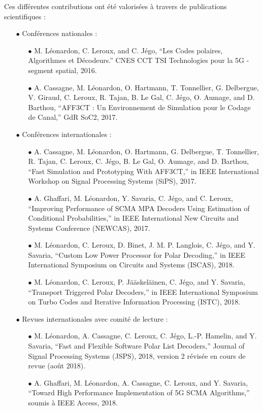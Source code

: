 \vspace{1cm}
Ces différentes contributions ont été valorisées à travers de publications scientifiques : \\

\begin{itemize}
		\item[$\bullet$] Conférences nationales :
	\begin{itemize}
		\item[$\bullet$] M. Léonardon, C. Leroux, and C. Jégo, “Les Codes polaires, Algorithmes et Décodeurs.”
		CNES CCT TSI Technologies pour la 5G - segment spatial, 2016.
     	\item[$\bullet$] A. Cassagne, M. Léonardon, O. Hartmann, T. Tonnellier, G. Delbergue, V. Giraud, C. Leroux, R. Tajan, B. Le Gal, C. Jégo, O. Aumage, and D. Barthou, “AFF3CT : Un Environnement de Simulation pour le Codage de Canal,” GdR SoC2, 2017.
	\end{itemize}
	\item[$\bullet$] Conférences internationales :
	\begin{itemize}
		\item[$\bullet$]  A. Cassagne, M. Léonardon, O. Hartmann, G. Delbergue, T. Tonnellier, R. Tajan, C. Leroux, C. Jégo, B. Le Gal, O. Aumage, and D. Barthou, “Fast Simulation and Prototyping With AFF3CT,” in IEEE International Workshop on Signal Processing Systems (SiPS), 2017.
		\item[$\bullet$] A. Ghaffari, M. Léonardon, Y. Savaria, C. Jégo, and C. Leroux, “Improving Performance of SCMA MPA Decoders Using Estimation of Conditional Probabilities,” in IEEE International New Circuits and Systems Conference (NEWCAS), 2017.
		\item[$\bullet$] M. Léonardon, C. Leroux, D. Binet, J. M. P. Langlois, C. Jégo, and Y. Savaria, “Custom Low Power Processor for Polar Decoding,” in IEEE International Symposium on Circuits and Systems (ISCAS), 2018.
		\item[$\bullet$] M. Léonardon, C. Leroux, P. Jääskeläinen, C. Jégo, and Y. Savaria, “Transport Triggered Polar Decoders,” in IEEE International Symposium on Turbo Codes and Iterative Information Processing (ISTC), 2018.
	\end{itemize}
	\item[$\bullet$] Revues internationales avec comité de lecture :
	\begin{itemize}
		\item[$\bullet$] M. Léonardon, A. Cassagne, C. Leroux, C. Jégo, L.-P. Hamelin, and Y. Savaria, “Fast and Flexible Software Polar List Decoders,” Journal of Signal Processing Systems (JSPS), 2018, version 2 révisée en cours de revue (août 2018).
        \item[$\bullet$] A. Ghaffari, M. Léonardon, A. Cassagne, C. Leroux, and Y. Savaria, “Toward High Performance Implementation of 5G SCMA Algorithms,” soumis à IEEE Access, 2018.
	\end{itemize}
\end{itemize}

